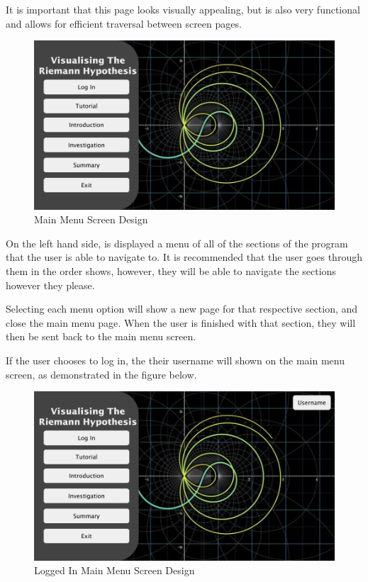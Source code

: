\documentclass{article}
\begin{document}
It is important that this page looks visually appealing, but is also very functional and allows for efficient traversal between screen pages.

\begin{figure}[ht]
    \centering
    \includegraphics[scale=0.2]{main-menu-screen-design}
    \caption{Main Menu Screen Design}
\end{figure}

On the left hand side, is displayed a menu of all of the sections of the program that the user is able to navigate to. It is recommended that the user goes through them in the order shows, however, they will be able to navigate the sections however they please.

Selecting each menu option will show a new page for that respective section, and close the main menu page. When the user is finished with that section, they will then be sent back to the main menu screen.

If the user chooses to log in, the their username will shown on the main menu screen, as demonstrated in the figure below.

\begin{figure}[h]
    \centering
    \includegraphics[scale=0.2]{main-menu-logged-in-screen-design}
    \caption{Logged In Main Menu Screen Design}
\end{figure}
\end{document}
